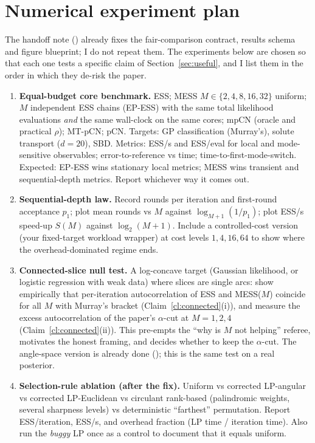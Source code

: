 \documentclass[11pt,a4paper]{article}
\theoremstyle{remark}
\begin{document}
\section{Numerical experiment plan}\label{sec:experiments}
The handoff note () already fixes the fair-comparison contract, results schema and figure blueprint; I do not repeat them. The experiments below are chosen so that each one tests a specific claim of Section~\ref{sec:useful}, and I list them in the order in which they de-risk the paper.
\begin{enumerate}[leftmargin=*,label=\textbf{E\arabic*}]
\item \textbf{Equal-budget core benchmark.} ESS; MESS $M\in\{2,4,8,16,32\}$ uniform; $M$ independent ESS chains (EP-ESS) with the same total likelihood evaluations \emph{and} the same wall-clock on the same cores; mpCN (oracle and practical $\rho$); MT-pCN; pCN. Targets: GP classification (Murray's), solute transport ($d=20$), SBD. Metrics: ESS/s and ESS/eval for local and mode-sensitive observables; error-to-reference vs time; time-to-first-mode-switch. Expected: EP-ESS wins stationary local metrics; MESS wins transient and sequential-depth metrics. Report whichever way it comes out.
\item \textbf{Sequential-depth law.} Record rounds per iteration and first-round acceptance $p_1$; plot mean rounds vs $M$ against $\log_{M+1}(1/p_1)$; plot ESS/s speed-up $S(M)$ against $\log_2(M+1)$. Include a controlled-cost version (your fixed-target workload wrapper) at cost levels $1,4,16,64$ to show where the overhead-dominated regime ends.
\item \textbf{Connected-slice null test.} A log-concave target (Gaussian likelihood, or logistic regression with weak data) where slices are single arcs: show empirically that per-iteration autocorrelation of ESS and MESS($M$) coincide for all $M$ with Murray's bracket (Claim~\ref{cl:connected}(i)), and measure the excess autocorrelation of the paper's $\alpha$-cut at $M=1,2,4$ (Claim~\ref{cl:connected}(ii)). This pre-empts the ``why is $M$ not helping'' referee, motivates the honest framing, and decides whether to keep the $\alpha$-cut. The angle-space version is already done (); this is the same test on a real posterior.
\item \textbf{Selection-rule ablation (after the fix).} Uniform vs corrected LP-angular vs corrected LP-Euclidean vs circulant rank-based (palindromic weights, several sharpness levels) vs deterministic ``farthest'' permutation. Report ESS/iteration, ESS/s, and overhead fraction (LP time / iteration time). Also run the \emph{buggy} LP once as a control to document that it equals uniform.

\end{enumerate}
\end{document}
